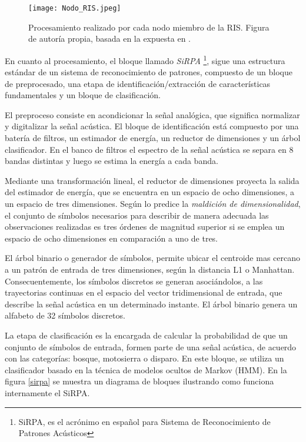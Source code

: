 \begin{figure}[h]
\texttt{[image: Nodo\_RIS.jpeg]}
\centering
\caption{Procesamiento realizado por cada nodo miembro de la RIS. Figura de autoría propia, basada en la expuesta en \cite{Carlosthesis}.}
\label{nodoRIS}
\end{figure}


En cuanto al procesamiento, el bloque llamado \textit{SiRPA} \footnote{SiRPA, es el acrónimo en español para Sistema de Reconocimiento de Patrones Acústicos}, sigue una estructura estándar de un sistema de reconocimiento de patrones, compuesto de un bloque de preprocesado, una etapa de identificación/extracción de características fundamentales y un bloque de clasificación.

El preproceso consiste en acondicionar la señal analógica, que significa normalizar y digitalizar la señal acústica. El bloque de identificación está compuesto por una batería de filtros, un estimador de energía, un reductor de dimensiones y un árbol clasificador. En el banco de filtros el espectro de la señal acústica se separa en 8 bandas distintas y luego se estima la energía a cada banda.

Mediante una transformación lineal, el reductor de dimensiones proyecta la salida del estimador de energía, que se encuentra en un espacio de ocho dimensiones, a un espacio de tres dimensiones. Según lo predice la \textit{maldición de dimensionalidad}, el conjunto de símbolos necesarios para describir de manera adecuada las observaciones realizadas es tres órdenes de magnitud superior si se emplea un espacio de ocho dimensiones en comparación a uno de tres. \cite{NeuralNetworks, Jordanthesis}

El árbol binario o generador de símbolos, permite ubicar el centroide mas cercano a un patrón de entrada de tres dimensiones, según la distancia L1 o Manhattan. Consecuentemente, los símbolos discretos se generan asociándolos, a las trayectorias continuas en el espacio del vector tridimensional de entrada, que describe la señal acústica en un determinado instante. El árbol binario genera un alfabeto de 32 símbolos discretos. \cite{IEEE_Panama, TDS, Jcardenas, EmbededTech}

La etapa de clasificación es la encargada de calcular la probabilidad de que un conjunto de símbolos de entrada, formen parte de una señal acústica, de acuerdo con las categorías: bosque, motosierra o disparo. En este bloque, se utiliza un clasificador basado en la técnica de modelos ocultos de Markov (HMM). En la figura \ref{sirpa} se muestra un diagrama de bloques ilustrando como funciona internamente el SiRPA.

